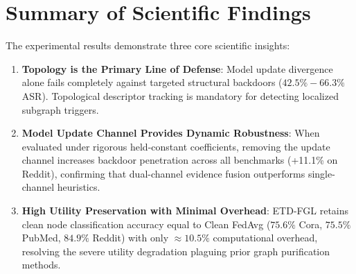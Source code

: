 \section{Summary of Scientific Findings}
\label{sec:summary_findings}
The experimental results demonstrate three core scientific insights:
\begin{enumerate}
    \item \textbf{Topology is the Primary Line of Defense}: Model update divergence alone fails completely against targeted structural backdoors ($42.5\% - 66.3\%$ ASR). Topological descriptor tracking is mandatory for detecting localized subgraph triggers.
    \item \textbf{Model Update Channel Provides Dynamic Robustness}: When evaluated under rigorous held-constant coefficients, removing the update channel increases backdoor penetration across all benchmarks (+11.1\% on Reddit), confirming that dual-channel evidence fusion outperforms single-channel heuristics.
    \item \textbf{High Utility Preservation with Minimal Overhead}: \textsc{ETD-FGL} retains clean node classification accuracy equal to Clean FedAvg ($75.6\%$ Cora, $75.5\%$ PubMed, $84.9\%$ Reddit) with only $\approx 10.5\%$ computational overhead, resolving the severe utility degradation plaguing prior graph purification methods.
\end{enumerate}
